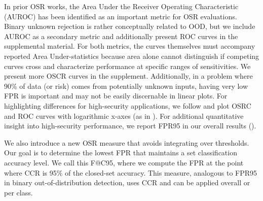 In prior OSR works, the Area Under the Receiver Operating Characteristic (AUROC) has been identified as an important metric for OSR evaluations.
Binary unknown rejection is rather conceptually related to OOD, but we include AUROC as a secondary metric and additionally present ROC curves in the supplemental material.
For both metrics, the curves themselves must accompany reported Area Under-statistics because area alone cannot distinguish if competing curves cross and characterize performance at specific ranges of sensitivities. 
We present more OSCR curves in the supplement.
Additionally, in a problem where 90\% of data (or risk) comes from potentially unknown inputs, having very low FPR is important and may not be easily discernable in linear plots.
For highlighting differences for high-security applications, we follow \citet{dhamija2018reducing} and plot OSRC and ROC curves with logarithmic x-axes (as in ).
For additional quantitative insight into high-security performance, we report FPR95 in our overall results ().

We also introduce a new OSR measure that avoids integrating over thresholds.
Our goal is to determine the lowest FPR that maintains a set classification accuracy level.
We call this F@C95, where we compute the FPR at the point where CCR is 95\% of the closed-set accuracy.
This measure, analogous to FPR95 in binary out-of-distribution detection, uses CCR and can be applied overall or per class.